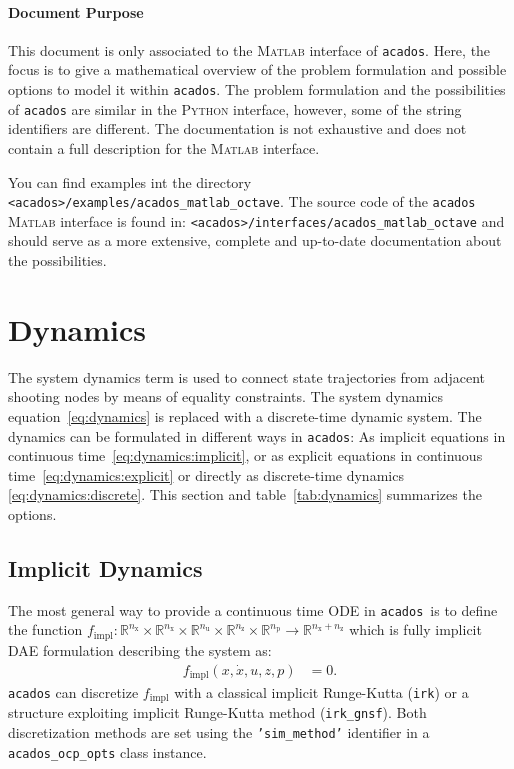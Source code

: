 \documentclass[
a4paper, %
10pt, %
notitlepage,
english]{CSUniSchoolLabReport}
\newcommand{\code}[1]{\texttt{#1}}
\newcommand{\acados}{\texttt{acados}}
\newcommand{\matlab}{\textsc{Matlab}}
\newcommand{\python}{\textsc{Python}}
\newcommand{\ind}[1]{_{\textrm{#1}}}
\newcommand{\nx}{n\ind{x}}
\newcommand{\nuu}{n\ind{u}}
\newcommand{\nz}{n\ind{z}}
\newcommand{\np}{n\ind{p}}
\begin{document}
\begin{appendices}
\paragraph{Document Purpose}
This document is only associated to the \matlab{} interface of \acados.
Here, the focus is to give a mathematical overview of the problem formulation and possible options to model it within \acados.
The problem formulation and the possibilities of \acados{} are similar in the \python{} interface, however, some of the string identifiers are different.
The documentation is not exhaustive and does not contain a full description for the \matlab{} interface.

You can find examples int the directory \code{<acados>/examples/acados\_matlab\_octave}.
The source code of the \acados{} \matlab{} interface is found in: \code{<acados>/interfaces/acados\_matlab\_octave} and should serve as a more extensive, complete and up-to-date documentation about the possibilities.
%
\section{Dynamics}\label{sec:dynamics}
%
The system dynamics term is used to connect state trajectories from adjacent shooting nodes by means of equality constraints.
%
The system dynamics equation~\eqref{eq:dynamics} is replaced with a discrete-time dynamic system.
The dynamics can be formulated in different ways in \acados:
As implicit equations in continuous time~\eqref{eq:dynamics:implicit}, or as explicit equations in continuous time~\eqref{eq:dynamics:explicit} or directly as discrete-time dynamics \eqref{eq:dynamics:discrete}.
This section and table~\ref{tab:dynamics} summarizes the options.
%
\subsection{Implicit Dynamics}\label{sec:dynamics:implicit}
%
The most general way to provide a continuous time ODE in \acados\ is to define the function $ f\ind{impl}: \mathbb{R}^{\nx}\times\mathbb{R}^{\nx}\times\mathbb{R}^{\nuu}\times\mathbb{R}^{\nz}\times\mathbb{R}^{\np} \rightarrow \mathbb{R}^{\nx+\nz}$ which is fully implicit DAE formulation describing the system as:
\begin{align}
	f\ind{impl}(x, \dot{x}, u, z, p) &= 0.\label{eq:dynamics:implicit}
\end{align}
\acados{} can discretize $ f\ind{impl} $ with a classical implicit Runge-Kutta (\code{irk}) or a structure exploiting implicit Runge-Kutta method (\code{irk\_gnsf}). Both discretization methods are set using the \code{'sim\_method'} identifier in a \code{acados\_ocp\_opts} class instance.


\end{appendices}
\end{document}
